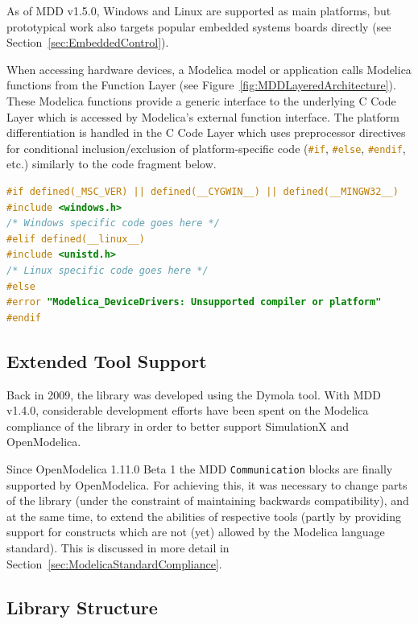 \documentclass{resources/modelica}
\newcommand{\clang}[1]{\lstinline[language=c]|#1|}
\newcommand{\modelica}[1]{\lstinline[language=modelica]|#1|}
\begin{document}
As of MDD v1.5.0, Windows and Linux are supported as main platforms,
but prototypical work also targets popular embedded systems boards directly (see
Section~\ref{sec:EmbeddedControl}).

When accessing hardware devices, a Modelica model or
application calls Modelica functions from the \textsf{Function Layer} (see
Figure~\ref{fig:MDDLayeredArchitecture}). These Modelica functions provide a
generic interface to the underlying \textsf{C Code Layer} which is accessed by
Modelica's external function interface.
The platform differentiation is handled in the \textsf{C Code Layer} which
uses preprocessor directives for conditional inclusion/exclusion of
platform-specific code (\mbox{\clang{#if}}, \mbox{\clang{#else}},
\mbox{\clang{#endif}}, etc.) similarly to the code fragment below.
\begin{lstlisting}[language=C]
#if defined(_MSC_VER) || defined(__CYGWIN__) || defined(__MINGW32__)
#include <windows.h>
/* Windows specific code goes here */
#elif defined(__linux__)
#include <unistd.h>
/* Linux specific code goes here */
#else
#error "Modelica_DeviceDrivers: Unsupported compiler or platform"
#endif
\end{lstlisting}

\subsection{Extended Tool Support}
\label{sec:ExtendedToolSupport}

Back in 2009, the library was developed using the Dymola tool. With MDD v1.4.0,
considerable development efforts have been spent on the Modelica compliance of
the library in order to better support SimulationX and OpenModelica.

Since OpenModelica 1.11.0 Beta 1 the MDD \modelica{Communication} blocks are finally
supported by OpenModelica. For achieving this, it was necessary to change parts
of the library (under the constraint of maintaining backwards compatibility),
and at the same time, to extend the abilities of respective tools (partly by
providing support for constructs which are not (yet) allowed by the Modelica
language standard). This is discussed in more detail in
Section~\ref{sec:ModelicaStandardCompliance}.

\subsection{Library Structure}
\label{sec:LibraryStructure}
\end{document}
